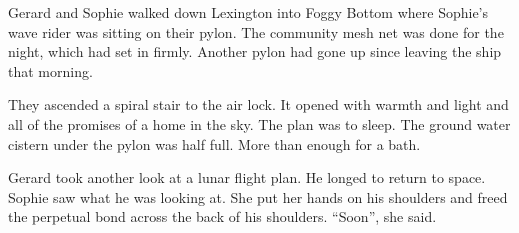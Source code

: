 

Gerard and Sophie walked down Lexington into Foggy Bottom where
Sophie's wave rider was sitting on their pylon.  The community mesh
net was done for the night, which had set in firmly.  Another pylon
had gone up since leaving the ship that morning.

They ascended a spiral stair to the air lock.  It opened with warmth
and light and all of the promises of a home in the sky.  The plan was
to sleep.  The ground water cistern under the pylon was half full.
More than enough for a bath.

Gerard took another look at a lunar flight plan.  He longed to return
to space.  Sophie saw what he was looking at.  She put her hands on
his shoulders and freed the perpetual bond across the back of his
shoulders.  ``Soon'', she said.

\bye
